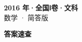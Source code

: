 \documentclass[zihao=-4, a4paper]{ctexart}
\begin{document}
\begin{center}
  {\Large\bfseries 2016 年·全国Ⅰ卷·文科}\\[4pt]
  {\large 数学 · 简答版}
\end{center}
\medskip
{}

\clearpage
{}
\begin{center}{\Large\bfseries 答案速查}\end{center}
\medskip

\end{document}
